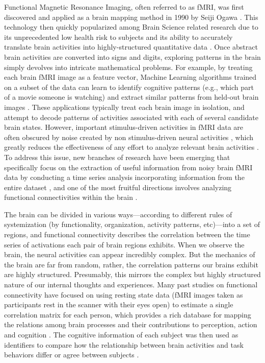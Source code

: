 \documentclass[11pt]{article}
\begin{document}
Functional Magnetic Resonance Imaging, often referred to as fMRI, was first discovered and applied as a brain mapping method in 1990 by Seiji Ogawa \citep{Ogawa90}. This technology then quickly popularized among Brain Science related research due to its unprecedented low health risk to subjects and its ability to accurately translate brain activities into highly-structured quantitative data \citep{Logothetis01,Friston99,Friston98}. Once abstract brain activities are converted into signs and digits, exploring patterns in the brain simply devolves into intricate mathematical problems. For example, by treating each brain fMRI image as a feature vector, Machine Learning algorithms trained on a subset of the data can learn to identify cognitive patterns (e.g., which part of a movie someone is watching) and extract similar patterns from held-out brain images \citep{Norman06,peterson12,peterson17}. These applications typically treat each brain image in isolation, and attempt to decode patterns of activities associated with each of several candidate brain states. However, important stimulus-driven activities in fMRI data are often obscured by noise created by non stimulus-driven neural activities \citep{peterson11}, which greatly reduces the effectiveness of any effort to analyze relevant brain activities \citep{hasson2009}. To address this issue, new branches of research have been emerging that specifically focus on the extraction of useful information from noisy brain fMRI data by conducting a time series analysis incorporating information from the entire dataset \citep{tang2017}, and one of the most fruitful directions involves analyzing functional connectivities within the brain \citep{peterson19} \citep{peterson20}.

The brain can be divided in various ways---according to different rules of systemization (by functionality, organization, activity patterns, etc)---into a set of regions, and functional connectivity describes the correlation between the time series of activations each pair of brain regions exhibits. When we observe the brain, the neural activities can appear incredibly complex. But the mechanics of the brain are far from random, rather, the correlation patterns our brains exhibit are highly structured. Presumably, this mirrors the complex but highly structured nature of our internal thoughts and experiences. Many past studies on functional connectivity have focused on using resting state data (fMRI images taken as participants rest in the scanner with their eyes open) to estimate a single correlation matrix for each person, which provides a rich database for mapping the relations among brain processes and their contributions to perception, action and cognition \citep{peterson9,Bassett2017}. The cognitive information of each subject was then used as identifiers to compare how the relationship between brain activities and task behaviors differ or agree between subjects \citep{Turke13,Rubinov2010,peterson10}.
\end{document}
